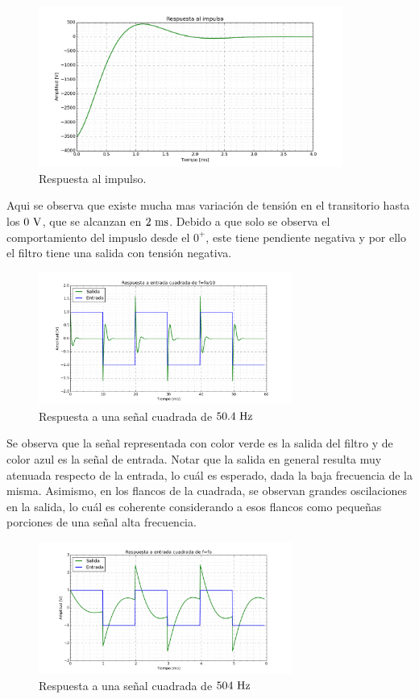 \begin{figure}[hbt]
	\centering
	\includegraphics[width=10cm]{imagenes/Impulse}	\caption{Respuesta al impulso.}
\end{figure}
Aqui se observa que existe mucha mas variaci\'on de tensi\'on en el transitorio hasta los $0\ \si{\volt}$, que se alcanzan en $2 \ \si{\milli\second}$. Debido a que solo se observa el comportamiento del impuslo desde el $0^+$, este tiene pendiente negativa y por ello el filtro tiene una salida con tensi\'on negativa. \\

\begin{figure}[H]
	\centering
	\includegraphics[width=8.3cm]{imagenes/Cuadrada_f:10}	\caption{Respuesta a una señal cuadrada de $50.4\ \si{\hertz}$}	
\end{figure}

Se observa que la señal representada con color verde es la salida  del filtro y de color azul es la señal de entrada. Notar que la salida en general resulta muy atenuada respecto de la entrada,  lo cu\'al es esperado, dada la baja frecuencia de la misma. Asimismo, en los flancos de la cuadrada, se observan grandes oscilaciones en la salida, lo cu\'al es coherente considerando a esos flancos como pequeñas porciones de una señal alta frecuencia.\\

\begin{figure}[hbt]
	\centering
	\includegraphics[width=8.3cm]{imagenes/Cuadrada_f}	\caption{Respuesta a una señal cuadrada de $504\ \si{\hertz}$}	
\end{figure}

